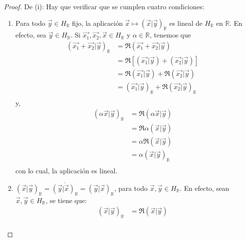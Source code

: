 \documentclass[12pt]{report}
\theoremstyle{largebreak}
\newcommand\pint[2]{\ensuremath{\left(#1\big|#2\right)}}
\newcommand\conj[1]{\ensuremath{\overline{#1}}}
\begin{document}
    \begin{proof}
        De (i): Hay que verificar que se cumplen cuatro condiciones:
        \begin{enumerate}
            \item Para todo $\vec{y}\in H_{\mathbb{R}}$ fijo, la aplicación $\vec{x} \mapsto\pint{\vec{x}}{\vec{y}}_{\mathbb{R}}$ es lineal de $H_{\mathbb{R}}$ en $\mathbb{R}$. En efecto, sea $\vec{y}\in H_{\mathbb{R}}$. Si $\vec{x_1},\vec{x_2},\vec{x} \in H_{\mathbb{R}}$ y $\alpha\in\mathbb{R}$, tenemos que
            \begin{equation*}
                \begin{split}
                    \pint{\vec{x_1}+\vec{x_2}}{\vec{y}}_{\mathbb{R}}&=\Re\pint{\vec{x_1}+\vec{x_2}}{\vec{y}}\\
                    &=\Re[\pint{\vec{x_1}}{\vec{y}}+\pint{\vec{x_2}}{\vec{y}}]\\
                    &=\Re\pint{\vec{x_1}}{\vec{y}}+\Re\pint{\vec{x_2}}{\vec{y}}\\
                    &=\pint{\vec{x_1}}{\vec{y}}_{\mathbb{R}}+\Re\pint{\vec{x_2}}{\vec{y}}_{\mathbb{R}}\\
                \end{split}
            \end{equation*}
            y,
            \begin{equation*}
                \begin{split}
                    \pint{\alpha\vec{x}}{\vec{y}}_{\mathbb{R}}&=\Re\pint{\alpha\vec{x}}{\vec{y}}\\
                    &=\Re\alpha\pint{\vec{x}}{\vec{y}}\\
                    &=\alpha\Re\pint{\vec{x}}{\vec{y}}\\
                    &=\alpha\pint{\vec{x}}{\vec{y}}_{\mathbb{R}}\\
                \end{split}
            \end{equation*}
            con lo cual, la aplicación es lineal.
            \item $\pint{\vec{x}}{\vec{y}}_{\mathbb{R}}=\conj{\pint{\vec{y}}{\vec{x}}_{\mathbb{R}}}=\pint{\vec{y}}{\vec{x}}_{\mathbb{R}}$, para todo $\vec{x},\vec{y}\in H_{\mathbb{R}}$. En efecto, sean $\vec{x},\vec{y}\in H_{\mathbb{R}}$, se tiene que:
            \begin{equation*}
                \begin{split}
                    \pint{\vec{x}}{\vec{y}}_{\mathbb{R}}&=\Re\pint{\vec{x}}{\vec{y}} \\

\end{split}
\end{equation*}
\end{enumerate}
\end{proof}
\end{document}
